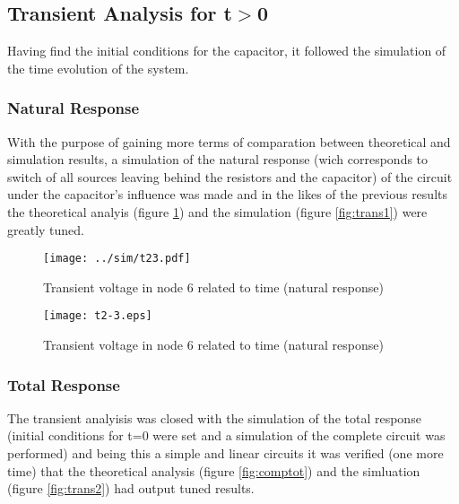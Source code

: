 

\subsection{Transient Analysis for t$>$0}

Having find the initial conditions for the capacitor, it followed the simulation of the time evolution of the system.

\subsubsection{Natural Response}

With the purpose of gaining more terms of comparation between theoretical and simulation results, a simulation of the natural response (wich corresponds to switch of all sources leaving behind the resistors and the capacitor) of the circuit under the capacitor's influence was made and in the likes of the previous results the theoretical analyis (figure \ref{fig:compnat}) and the simulation (figure \ref{fig:trans1}) were greatly tuned.

\begin{figure}[h] \centering
  \begin{minipage}{.5\textwidth}
    \texttt{[image: ../sim/t23.pdf]}
    \caption{Transient voltage in node 6 related to time (natural response)}
    \label{fig:trans1}
    \end{minipage}%
  \begin{minipage}{.5\textwidth}
    \vspace{10mm}
  \centering
    \texttt{[image: t2-3.eps]}
    \caption{Transient voltage in node 6 related to time (natural response)}
    \label{fig:compnat}
      \end{minipage}%
\end{figure}
  
\subsubsection{Total Response}

The transient analyisis was closed with the simulation of the total response (initial conditions for t=0 were set and a simulation of the complete circuit was performed) and being this a simple and linear circuits it was verified (one more time) that the theoretical analysis (figure \ref{fig:comptot}) and the simluation (figure \ref{fig:trans2}) had output tuned results.


